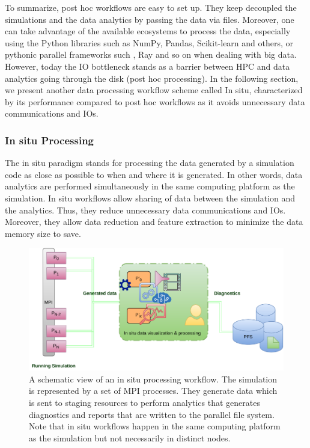 To summarize, post hoc workflows are easy to set up. They keep decoupled the simulations and the data analytics by passing the data via files. Moreover, one can take advantage of the available ecosystems to process the data, especially using the Python libraries such as NumPy, Pandas, Scikit-learn and others, or pythonic parallel frameworks such \dask, Ray and so on when dealing with big data. However, today the IO bottleneck stands as a barrier between HPC and data analytics going through the disk (post hoc processing). In the following section, we present another data processing workflow scheme called In situ, characterized by its performance compared to post hoc workflows as it avoids unnecessary data communications and IOs.      



\subsubsection{In situ Processing}\label{sec:insitu}

The in situ\cite{InSituLiuMa:2007, in_situ_methodes} paradigm stands for processing the data generated by a simulation code as close as possible to when and where it is generated. In other words, data analytics are performed simultaneously in the same computing platform as the simulation.
In situ workflows allow sharing of data between the simulation and the analytics. Thus, they reduce unnecessary data communications and IOs. Moreover, they allow data reduction and feature extraction to minimize the data memory size to save.   

\begin{figure}[!h]\centering
\includegraphics[scale=0.9]{figures/insitu.pdf}
\caption{A schematic view of an in situ processing workflow. The simulation is represented by a set of MPI processes. They generate data which is sent to staging resources to perform analytics that generates diagnostics and reports that are written to the parallel file system. Note that in situ workflows happen in the same computing platform as the simulation but not necessarily in distinct nodes.}
\label{figinsitu}
\end{figure}

